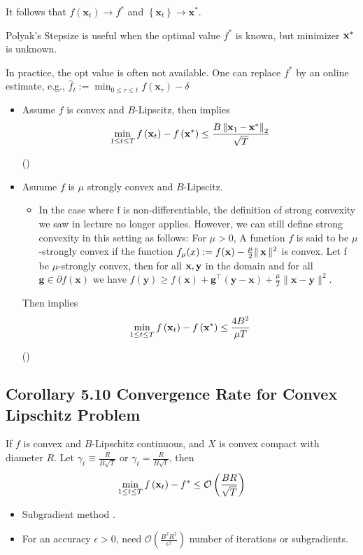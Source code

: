 It follows that $f\left(\mathbf{x}_{t}\right) \rightarrow f^{*}$ and $\left\{\mathbf{x}_{t}\right\} \rightarrow \mathbf{x}^{*}$.

Polyak's Stepsize is useful when the optimal value $f^{*}$ is known, but minimizer $\boldsymbol{\mathbf{x}}^*$ is unknown.

In practice, the opt value is often not available. One can replace $f^{*}$ by an online estimate, e.g., $\displaystyle\hat{f}_{t}:=\min _{0 \leq \tau \leq t} f\left(\mathbf{x}_{\tau}\right)-\delta$

\begin{itemize}[leftmargin=*]
    \item Assume $f$ is convex and $B$-Lipscitz, then \red{(*)} implies
    $$\min _{1 \leq t \leq T} f\left(\operatorname{\boldsymbol{\mathbf{x}}}_{t}\right)-f\left(\operatorname{\boldsymbol{\mathbf{x}}}^{*}\right) \leq \frac{B\left\|\operatorname{\boldsymbol{\mathbf{x}}}_{1}-\operatorname{\boldsymbol{\mathbf{x}}}^{*}\right\|_{2}}{\sqrt{T}}$$
    
    ()
    
    \item Asuume $f$ is $\mu$ strongly convex and $B$-Lipscitz. 
    \begin{itemize}[leftmargin=*]
    \item In the case where $\mathrm{f}$ is non-differentiable, the definition of strong convexity we saw in lecture no longer applies. However, we can still define strong convexity in this setting as follows: For $\mu>0$, A function $f$ is said to be $\mu$-strongly convex if the function $f_{\mu}(x):=f(\operatorname{\boldsymbol{\mathbf{x}}})-\frac{\mu}{2}\|\operatorname{\boldsymbol{\mathbf{x}}}\|^{2}$ is convex. Let f be $\mu$-strongly convex, then for all $\operatorname{\boldsymbol{\mathbf{x}}}, \operatorname{\boldsymbol{\mathbf{y}}}$ in the domain and for all $\mathbf{g} \in \partial {f}(\mathbf{x})$ we have ${f}(\mathbf{y}) \geq {f}(\mathbf{x})+\mathbf{g}^{\top}(\mathbf{y}-\mathbf{x})+\frac{\mu}{2}\|\mathbf{x}-\mathbf{y}\|^{2}$.
    \end{itemize}
    Then \red{(*)} implies
$$\min _{1 \leq t \leq T} f\left(\operatorname{\boldsymbol{\mathbf{x}}}_{t}\right)-f\left(\operatorname{\boldsymbol{\mathbf{x}}}^{*}\right) \leq \frac{4 B^{2}}{\mu T}$$

()
\end{itemize}




\subsection*{Corollary 5.10 Convergence Rate for Convex Lipschitz Problem}
If $f$ is convex and $B$-Lipschitz continuous, and $X$ is convex compact with diameter $R$. Let $\gamma_{t} \equiv \frac{R}{B \sqrt{T}}$ or $\gamma_{t} = \frac{R}{B \sqrt{t}}$, then
$$
\min _{1 \leq t \leq T} f\left(\mathbf{x}_{t}\right)-f^{*} \leq \operatorname{\mathcal{O}}\left(\frac{B R}{\sqrt{T}}\right)
$$
\begin{itemize}[leftmargin=*]
    \item Subgradient method .
    \item For an accuracy $\epsilon>0$, need $\mathcal{O}\left(\frac{B^{2} R^{2}}{\epsilon^{2}}\right)$ number of iterations or subgradients.
\end{itemize}





